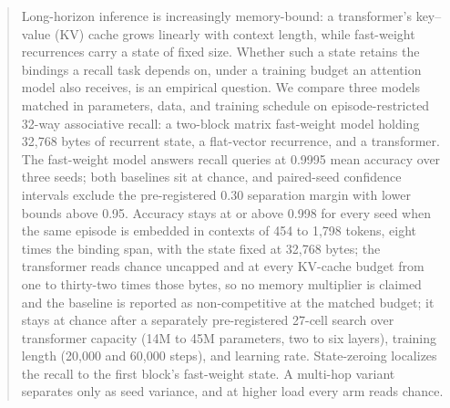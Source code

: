 \begin{abstract}
Long-horizon inference is increasingly memory-bound: a transformer's
key--value (KV) cache grows linearly with
context length, while fast-weight recurrences carry a state of fixed size.
Whether such a state retains the bindings a recall task depends on, under a
training budget an attention model also receives, is an empirical question.
We compare three models matched in parameters, data, and training schedule
on episode-restricted 32-way associative recall: a two-block matrix
fast-weight model holding 32{,}768 bytes of recurrent
state, %
a flat-vector recurrence, and a transformer. The fast-weight model answers recall queries
at 0.9995 mean accuracy over three seeds; %
both baselines sit at chance, and paired-seed confidence intervals exclude
the pre-registered 0.30 separation margin with lower bounds above
0.95. %
Accuracy stays at or above 0.998 for every seed when the same episode is
embedded in contexts of 454 to 1{,}798 tokens, eight times the binding
span, with the state fixed at 32{,}768 bytes; %
the transformer reads chance uncapped and at every KV-cache budget from one
to thirty-two times those bytes, %
so no memory multiplier is claimed and the baseline is reported as
non-competitive at the matched budget; it stays at chance after a
separately pre-registered 27-cell search over transformer capacity (14M to
45M parameters, two to six layers), training length (20{,}000 and 60{,}000
steps), and learning rate. %
State-zeroing localizes the recall
to the first block's fast-weight state. %
A multi-hop variant separates only as seed variance, and at higher load
every arm reads chance. %
\end{abstract}
